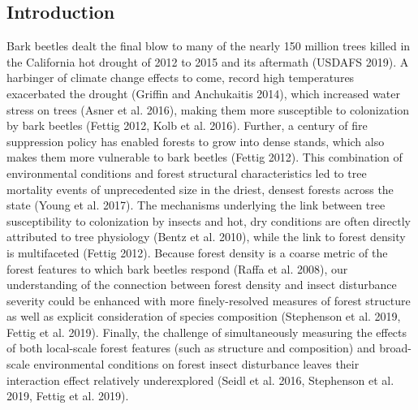 \documentclass[]{article}
\begin{document}
\hypertarget{introduction}{%
\subsection{Introduction}\label{introduction}}

Bark beetles dealt the final blow to many of the nearly 150 million
trees killed in the California hot drought of 2012 to 2015 and its
aftermath (USDAFS 2019). A harbinger of climate change effects to come,
record high temperatures exacerbated the drought (Griffin and
Anchukaitis 2014), which increased water stress on trees (Asner et al.
2016), making them more susceptible to colonization by bark beetles
(Fettig 2012, Kolb et al. 2016). Further, a century of fire suppression
policy has enabled forests to grow into dense stands, which also makes
them more vulnerable to bark beetles (Fettig 2012). This combination of
environmental conditions and forest structural characteristics led to
tree mortality events of unprecedented size in the driest, densest
forests across the state (Young et al. 2017). The mechanisms underlying
the link between tree susceptibility to colonization by insects and hot,
dry conditions are often directly attributed to tree physiology (Bentz
et al. 2010), while the link to forest density is multifaceted (Fettig
2012). Because forest density is a coarse metric of the forest features
to which bark beetles respond (Raffa et al. 2008), our understanding of
the connection between forest density and insect disturbance severity
could be enhanced with more finely-resolved measures of forest structure
as well as explicit consideration of species composition (Stephenson et
al. 2019, Fettig et al. 2019). Finally, the challenge of simultaneously
measuring the effects of both local-scale forest features (such as
structure and composition) and broad-scale environmental conditions on
forest insect disturbance leaves their interaction effect relatively
underexplored (Seidl et al. 2016, Stephenson et al. 2019, Fettig et al.
2019).
\end{document}
